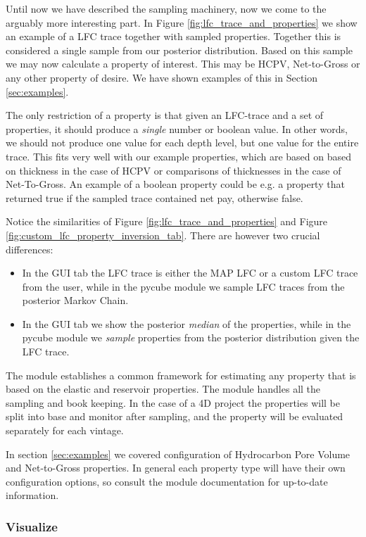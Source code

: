 \documentclass[note,screen,english,12pt,utf8]{nrdoc}
\begin{document}
Until now we have described the sampling machinery, now we come to the arguably
more interesting part. In Figure \ref{fig:lfc_trace_and_properties} we show an
example of a LFC trace together with sampled properties. Together this is considered
a single sample from our posterior distribution. Based on this sample we may
now calculate a property of interest. This may be HCPV, Net-to-Gross or any
other property of desire. We have shown examples of this in Section \ref{sec:examples}.

The only restriction of a property is that given an LFC-trace and a set of
properties, it should produce a \textit{single} number or boolean value.
In other words, we should not produce one value for each depth level,
but one value for the entire trace. This fits very well with our example properties,
which are based on based on thickness in the case of HCPV or comparisons of
thicknesses in the case of Net-To-Gross. An example of a boolean property
could be e.g. a property that returned true if the sampled trace contained
net pay, otherwise false.

Notice the similarities of Figure \ref{fig:lfc_trace_and_properties} and
Figure \ref{fig:custom_lfc_property_inversion_tab}. There are however two
crucial differences:
\begin{itemize}
    \item In the GUI tab the LFC trace is either the MAP LFC or a custom LFC trace
          from the user, while in the pycube module we sample LFC traces
          from the posterior Markov Chain.
    \item In the GUI tab we show the posterior \textit{median} of the properties,
          while in the pycube module we \textit{sample} properties from the posterior
          distribution given the LFC trace.
\end{itemize}

The module establishes a common framework for estimating any property that
is based on the elastic and reservoir properties. The module handles all the
sampling and book keeping. In the case of a 4D project the properties will
be split into base and monitor after sampling, and the property will be
evaluated separately for each vintage.

In section \ref{sec:examples} we covered configuration of Hydrocarbon Pore
Volume and Net-to-Gross properties. In general each property type will
have their own configuration options, so consult the module documentation
for up-to-date information.

\subsubsection{Visualize}
\end{document}
